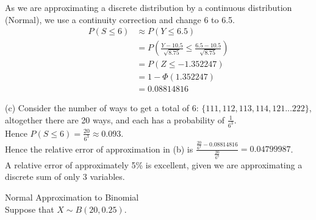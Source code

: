 \documentclass[bigtut]{tutorial}\usepackage[]{graphicx}\usepackage[]{color}
\begin{document}
\begin{tutorial}
\begin{questions}
\begin{solution}
As we are approximating a discrete distribution by a continuous distribution (Normal), we use a continuity correction and  change 6 to 6.5.
\begin{align*} 
P(S \leq 6) & \approx P(Y \leq 6.5) \\
& = P( \frac {Y - 10.5}{\sqrt{8.75}} \leq \frac{6.5-10.5}{\sqrt{8.75}} ) \\
& = P(Z \leq -1.352247) \\
& = 1-\Phi(1.352247) \\
& =0.08814816
\end{align*}

\vspace{.5cm}
(c)
Consider the number of ways to get a total of 6: 
$\{ 111, 112, 113, 114, 121 ... 222\}$, altogether there are 20 ways, and each has a probability of $\frac{1}{6^3}$. \\
Hence 
$P(S\leq 6) = \frac{20}{6^3} \approx 0.093 $. \\
Hence the relative error of approximation in (b) is $\frac{\frac{20}{6^3} - 0.08814816}{\frac{20}{6^3}} = 0.04799987$. \\
A relative error of approximately 5\% is excellent, given we are approximating a discrete sum of only 3 variables.

\end{solution}


\question  Normal Approximation to Binomial \\

Suppose that $X\sim B(20,0.25)$. \\

\end{questions}
\end{tutorial}
\end{document}
